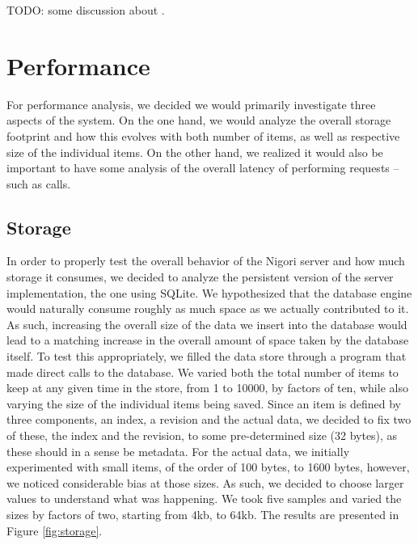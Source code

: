TODO: some discussion about .

\section{Performance}
For performance analysis, we decided we would primarily investigate three aspects of the system.
On the one hand, we would analyze the overall storage footprint and how this evolves with both number of items, as well as respective size of the individual items.
On the other hand, we realized it would also be important to have some analysis of the overall latency of performing requests -- such as  calls.

\subsection{Storage}
In order to properly test the overall behavior of the Nigori server and how much storage it consumes, we decided to analyze the persistent version of the server implementation, the one using SQLite.
We hypothesized that the database engine would naturally consume roughly as much space as we actually contributed to it.
As such, increasing the overall size of the data we insert into the database would lead to a matching increase in the overall amount of space taken by the database itself.
To test this appropriately, we filled the data store through a program that made direct calls to the database.
We varied both the total number of items to keep at any given time in the store, from 1 to 10000, by factors of ten, while also varying the size of the individual items being saved.
Since an item is defined by three components, an index, a revision and the actual data, we decided to fix two of these, the index and the revision, to some pre-determined size (32 bytes), as these should in a sense be metadata.
For the actual data, we initially experimented with small items, of the order of 100 bytes, to 1600 bytes, however, we noticed considerable bias at those sizes.
As such, we decided to choose larger values to understand what was happening.
We took five samples and varied the sizes by factors of two, starting from 4kb, to 64kb.
The results are presented in Figure \ref{fig:storage}.

